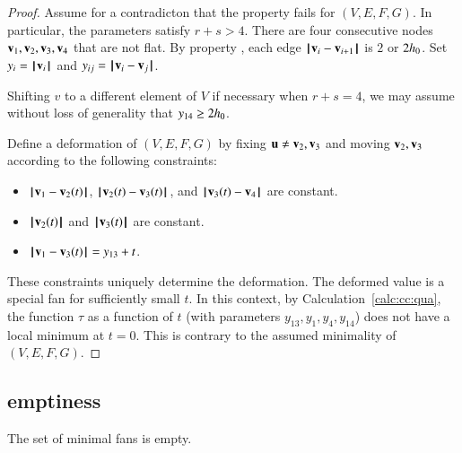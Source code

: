 \begin{proof} 
Assume for a contradicton that the property fails for $(V,E,F,G)$.
In particular, the parameters satisfy $r+s>4$.
There are four consecutive nodes $\v_1,\v_2,\v_3,\v_4$ that are not flat.   By property ,   each edge $\norm{\v_i}{\v_{i+1}}$ is $2$ or $2\hm$. Set $y_i = \normo{\v_i}$ and $y_{ij} = \norm{\v_i}{\v_j}$.   

Shifting $v$ to a different element of $V$ if necessary when $r+s=4$, we may
assume without loss of generality that $y_{14}\ge 2\hm$.

Define a deformation of $(V,E,F,G)$ by fixing $\u\ne \v_2,\v_3$ and moving $\v_2,\v_3$ according to the following constraints:
\begin{itemize}
\item $\norm{\v_1}{\v_2(t)}$, $\norm{\v_2(t)}{\v_3(t)}$, and $\norm{\v_3(t)}{\v_4}$ are constant.
\item $\normo{\v_2(t)}$ and $\normo{\v_3(t)}$ are constant.
\item $\norm{\v_1}{\v_3(t)} = y_{13} + t$.
\end{itemize}
These constraints uniquely determine the deformation. The deformed value is a special fan for sufficiently small $t$.  In this context, by Calculation~\ref{calc:cc:qua}, the function $\tau$ as a function of $t$ (with parameters $y_{13},y_1,y_4,y_{14}$) does not have a local minimum at $t=0$.
This is contrary to the assumed minimality of $(V,E,F,G)$.
\end{proof}


\subsection{emptiness}

\begin{lemma}\label{lemma:min-empty}  
The set of minimal fans is empty.
\end{lemma}

